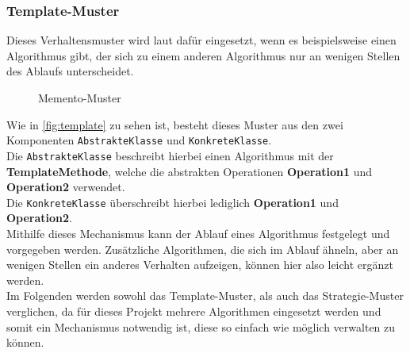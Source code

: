 \subsubsection{Template-Muster}
Dieses Verhaltensmuster wird laut \cite[325ff.]{gamma.2011} dafür eingesetzt, wenn es beispielsweise einen Algorithmus gibt, der sich zu einem anderen Algorithmus nur an wenigen Stellen des Ablaufs unterscheidet.\\
\begin{figure}[h]
\centering
{}
\caption{Memento-Muster \cite[In Anlehnung an][S.327]{gamma.2011}}
\label{fig:template}
\end{figure}
Wie in \autoref{fig:template} zu sehen ist, besteht dieses Muster aus den zwei Komponenten \texttt{AbstrakteKlasse} und \texttt{KonkreteKlasse}.\\
Die \texttt{AbstrakteKlasse} beschreibt hierbei einen Algorithmus mit der \textbf{TemplateMethode}, welche die abstrakten Operationen \textbf{Operation1} und \textbf{Operation2} verwendet.\\
Die \texttt{KonkreteKlasse} überschreibt hierbei lediglich \textbf{Operation1} und \textbf{Operation2}.\\
Mithilfe dieses Mechanismus kann der Ablauf eines Algorithmus festgelegt und vorgegeben werden. Zusätzliche Algorithmen, die sich im Ablauf ähneln, aber an wenigen Stellen ein anderes Verhalten aufzeigen, können hier also leicht ergänzt werden.\\
Im Folgenden werden sowohl das Template-Muster, als auch das Strategie-Muster verglichen, da für dieses Projekt mehrere Algorithmen eingesetzt werden und somit ein Mechanismus notwendig ist, diese so einfach wie möglich verwalten zu können.\\
